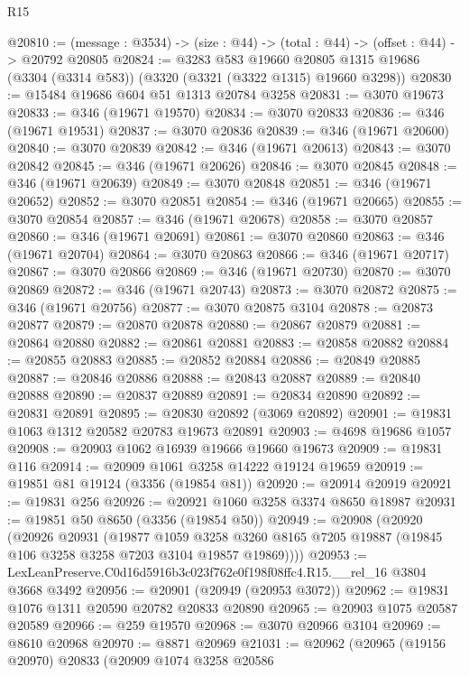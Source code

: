\begin{lexlean}{R15}
\begin{coremodule}
@20810 := (message : @3534) -> (size : @44) -> (total : @44) -> (offset : @44) -> @20792 @20805
@20824 := @3283
    @583
    @19660
    @20805
    @1315
    @19686
    (@3304 (@3314 @583))
    (@3320 (@3321 (@3322 @1315) @19660 @3298))
@20830 := @15484 @19686 @604 @51 @1313 @20784 @3258
@20831 := @3070 @19673
@20833 := @346 (@19671 @19570)
@20834 := @3070 @20833
@20836 := @346 (@19671 @19531)
@20837 := @3070 @20836
@20839 := @346 (@19671 @20600)
@20840 := @3070 @20839
@20842 := @346 (@19671 @20613)
@20843 := @3070 @20842
@20845 := @346 (@19671 @20626)
@20846 := @3070 @20845
@20848 := @346 (@19671 @20639)
@20849 := @3070 @20848
@20851 := @346 (@19671 @20652)
@20852 := @3070 @20851
@20854 := @346 (@19671 @20665)
@20855 := @3070 @20854
@20857 := @346 (@19671 @20678)
@20858 := @3070 @20857
@20860 := @346 (@19671 @20691)
@20861 := @3070 @20860
@20863 := @346 (@19671 @20704)
@20864 := @3070 @20863
@20866 := @346 (@19671 @20717)
@20867 := @3070 @20866
@20869 := @346 (@19671 @20730)
@20870 := @3070 @20869
@20872 := @346 (@19671 @20743)
@20873 := @3070 @20872
@20875 := @346 (@19671 @20756)
@20877 := @3070 @20875 @3104
@20878 := @20873 @20877
@20879 := @20870 @20878
@20880 := @20867 @20879
@20881 := @20864 @20880
@20882 := @20861 @20881
@20883 := @20858 @20882
@20884 := @20855 @20883
@20885 := @20852 @20884
@20886 := @20849 @20885
@20887 := @20846 @20886
@20888 := @20843 @20887
@20889 := @20840 @20888
@20890 := @20837 @20889
@20891 := @20834 @20890
@20892 := @20831 @20891
@20895 := @20830 @20892 (@3069 @20892)
@20901 := @19831 @1063 @1312 @20582 @20783 @19673 @20891
@20903 := @4698 @19686 @1057
@20908 := @20903 @1062 @16939 @19666 @19660 @19673
@20909 := @19831 @116
@20914 := @20909 @1061 @3258 @14222 @19124 @19659
@20919 := @19851 @81 @19124 (@3356 (@19854 @81))
@20920 := @20914 @20919
@20921 := @19831 @256
@20926 := @20921 @1060 @3258 @3374 @8650 @18987
@20931 := @19851 @50 @8650 (@3356 (@19854 @50))
@20949 := @20908
    (@20920
      (@20926
        @20931
        (@19877
          @1059
          @3258
          @3260
          @8165
          @7205
          @19887
          (@19845 @106 @3258 @3258 @7203 @3104 @19857 @19869))))
@20953 := LexLeanPreserve.C0d16d5916b3c023f762e0f198f08ffc4.R15.__rel_16 @3804 @3668 @3492
@20956 := @20901 (@20949 (@20953 @3072))
@20962 := @19831 @1076 @1311 @20590 @20782 @20833 @20890
@20965 := @20903 @1075 @20587 @20589
@20966 := @259 @19570
@20968 := @3070 @20966 @3104
@20969 := @8610 @20968
@20970 := @8871 @20969
@21031 := @20962
    (@20965
      (@19156 @20970)
      @20833
      (@20909
        @1074
        @3258
        @20586

\end{coremodule}
\end{lexlean}
